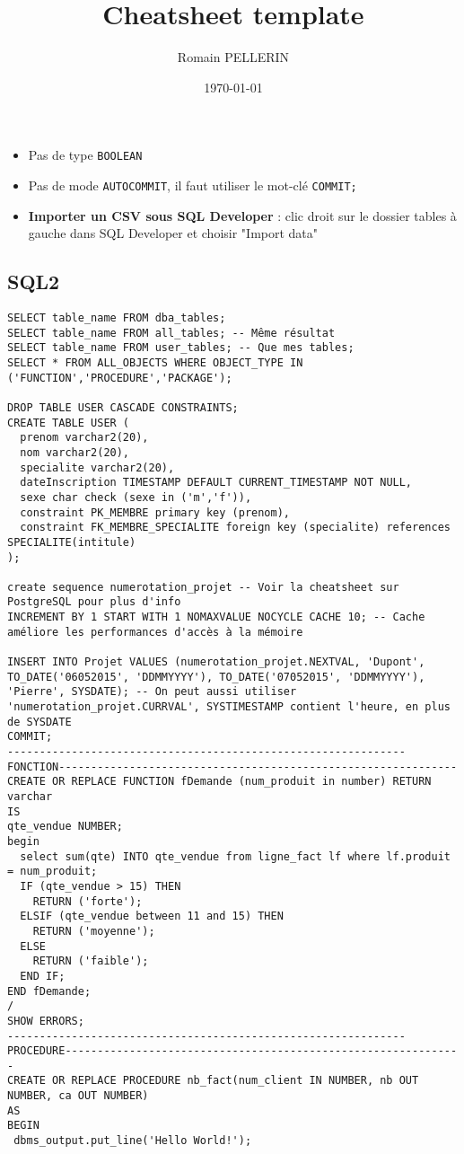 \documentclass[11pt,a4paper,oneside,french,svgnames]{report}
\title{Cheatsheet template}
\author{Romain PELLERIN}
\date\today
\newcommand{\code}[2]{\lstset{
  language=#2,
  title={{\setlength{\fboxsep}{1pt}\fcolorbox{orange}{yellow!20}{\sffamily\scriptsize
              \textcolor{gray!10}{\_}{#1}\textcolor{gray!10}{\_}}}}
  }
}
\begin{document}
\scriptsize

\begin{itemize}
  \item Pas de type \lstinline{BOOLEAN}
  \item Pas de mode \lstinline{AUTOCOMMIT}, il faut utiliser le mot-clé \lstinline{COMMIT;}
  \item \textbf{Importer un CSV sous SQL Developer} : clic droit sur le dossier tables à gauche dans SQL Developer et choisir "Import data"
\end{itemize}

\subsection*{SQL2}
\code{PL/SQL}{SQL}
\begin{lstlisting}
SELECT table_name FROM dba_tables;
SELECT table_name FROM all_tables; -- Même résultat
SELECT table_name FROM user_tables; -- Que mes tables;
SELECT * FROM ALL_OBJECTS WHERE OBJECT_TYPE IN ('FUNCTION','PROCEDURE','PACKAGE');

DROP TABLE USER CASCADE CONSTRAINTS;
CREATE TABLE USER ( 
  prenom varchar2(20), 
  nom varchar2(20), 
  specialite varchar2(20), 
  dateInscription TIMESTAMP DEFAULT CURRENT_TIMESTAMP NOT NULL,
  sexe char check (sexe in ('m','f')),
  constraint PK_MEMBRE primary key (prenom),
  constraint FK_MEMBRE_SPECIALITE foreign key (specialite) references SPECIALITE(intitule)
);

create sequence numerotation_projet -- Voir la cheatsheet sur PostgreSQL pour plus d'info
INCREMENT BY 1 START WITH 1 NOMAXVALUE NOCYCLE CACHE 10; -- Cache améliore les performances d'accès à la mémoire

INSERT INTO Projet VALUES (numerotation_projet.NEXTVAL, 'Dupont', TO_DATE('06052015', 'DDMMYYYY'), TO_DATE('07052015', 'DDMMYYYY'), 'Pierre', SYSDATE); -- On peut aussi utiliser 'numerotation_projet.CURRVAL', SYSTIMESTAMP contient l'heure, en plus de SYSDATE
COMMIT;
--------------------------------------------------------------FONCTION--------------------------------------------------------------
CREATE OR REPLACE FUNCTION fDemande (num_produit in number) RETURN varchar
IS
qte_vendue NUMBER;
begin
  select sum(qte) INTO qte_vendue from ligne_fact lf where lf.produit = num_produit;
  IF (qte_vendue > 15) THEN
    RETURN ('forte');
  ELSIF (qte_vendue between 11 and 15) THEN
    RETURN ('moyenne');
  ELSE
    RETURN ('faible');
  END IF;
END fDemande;
/
SHOW ERRORS;
--------------------------------------------------------------PROCEDURE--------------------------------------------------------------
CREATE OR REPLACE PROCEDURE nb_fact(num_client IN NUMBER, nb OUT NUMBER, ca OUT NUMBER)
AS
BEGIN
 dbms_output.put_line('Hello World!');
 

\end{lstlisting}
\end{document}
